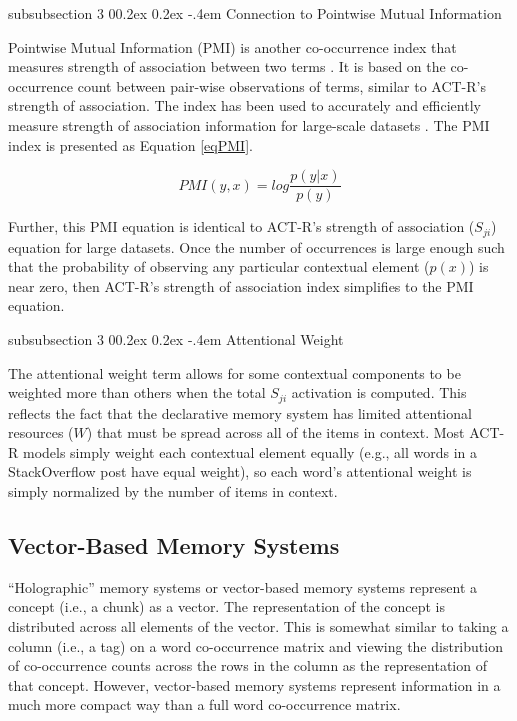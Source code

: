 \documentclass[man,floatsintext,donotrepeattitle]{apa6}
\makeatletter
\renewcommand{\subsubsection}{%
  \@startsection
  {subsubsection}%
  {3}%
  {\parindent}%
  {0\baselineskip \@plus 0.2ex \@minus 0.2ex}%
  {-.4em}%
  {\normalfont\normalsize\bfseries\addperi}}
\makeatother
\begin{document}
\subsubsection{Connection to Pointwise Mutual Information}

Pointwise Mutual Information (PMI) is another co-occurrence index that measures strength of association between two terms \parencite{Farahat2004}.
It is based on the co-occurrence count between pair-wise observations of terms, similar to ACT-R's strength of association.
The index has been used to accurately and efficiently measure strength of association information for large-scale datasets \parencite{Budiu2007,Farahat2004}.
The PMI index is presented as Equation \eqref{eqPMI}.

\begin{equation}
  \label{eqPMI}
  \mathit{PMI}(y,x) = log \frac{p(y|x)}{p(y)}
\end{equation}

Further, this PMI equation is identical to ACT-R's strength of association ($S_{ji}$) equation for large datasets.
Once the number of occurrences is large enough such that the probability of observing any particular contextual element ($p(x)$) is near zero, then ACT-R's strength of association index simplifies to the PMI equation.

\subsubsection{Attentional Weight}

The attentional weight term allows for some contextual components to be weighted more than others when the total $S_{ji}$ activation is computed.
This reflects the fact that the declarative memory system has limited attentional resources ($W$) that must be spread across all of the items in context.
Most ACT-R models simply weight each contextual element equally (e.g., all words in a StackOverflow post have equal weight), so each word's attentional weight is simply normalized by the number of items in context.

\subsection{Vector-Based Memory Systems}

``Holographic'' memory systems \parencite{Plate1995} or vector-based memory systems represent a concept (i.e., a chunk) as a vector.
The representation of the concept is distributed across all elements of the vector.
This is somewhat similar to taking a column (i.e., a tag) on a word co-occurrence matrix and viewing the distribution of co-occurrence counts across the rows in the column as the representation of that concept.
However, vector-based memory systems represent information in a much more compact way than a full word co-occurrence matrix.
\end{document}
